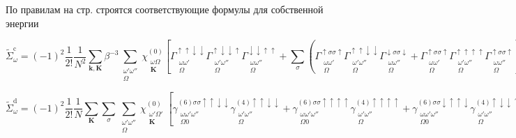 \documentclass[11pt,a4paper]{report}
\begin{document}
\vspace{1cm}

По правилам на стр.\pageref{rules} строятся соответствующие формулы для собственной энергии

\begin{equation}
 \tilde{\Sigma}^\text{c}_\omega = (-1)^2 \frac{1}{2!} \frac{1}{N^2} \sum_{\mathbf{k,K}} \beta^{-3}  \sum_{\substack{\omega'\omega''\\\Omega}} \chi_{\substack{\omega\Omega\\\mathbf{K}}}^{(0)}
 \left[
 \Gamma^{\uparrow\uparrow\downarrow\downarrow}_{\substack{\omega\omega'\\\Omega}}  \Gamma^{\uparrow\downarrow\downarrow\uparrow}_{\substack{\omega'\omega''\\\Omega}}  \Gamma^{\downarrow\downarrow\uparrow\uparrow}_{\substack{\omega\omega''\\\Omega}}
 + \sum_{\sigma} \left(
 \Gamma^{\uparrow\sigma\sigma\uparrow}_{\substack{\omega\omega'\\\Omega}}  \Gamma^{\uparrow\uparrow\downarrow\downarrow}_{\substack{\omega'\omega''\\\Omega}}  \Gamma^{\downarrow\sigma\sigma\downarrow}_{\substack{\omega\omega''\\\Omega}}+
 \Gamma^{\uparrow\sigma\sigma\uparrow}_{\substack{\omega\omega'\\\Omega}}  \Gamma^{\uparrow\uparrow\uparrow\uparrow}_{\substack{\omega'\omega''\\\Omega}}  \Gamma^{\uparrow\sigma\sigma\uparrow}_{\substack{\omega\omega''\\\Omega}}
 \right)
 \right]_\mathbf{K}
 \chi_{\substack{\omega''\Omega\\\mathbf{K}}}^{(0)}  G_{\substack{\omega+\Omega\\\mathbf{k+K}}}
\end{equation}

\begin{equation}
 \tilde{\Sigma}^\text{d}_\omega = (-1)^2 \frac{1}{2!} \frac{1}{N} \sum_{\mathbf{K}} \sum_{\sigma}\sum_{\substack{\omega'\omega''\\\Omega}}
 \chi_{\substack{\omega'\Omega'\\\mathbf{K}}}^{(0)} \left[
  \gamma^{(6)\sigma\sigma\uparrow\uparrow\downarrow\downarrow}_{\substack{\omega\omega'\omega''\\\Omega 0}} \gamma^{(4)\uparrow\uparrow\downarrow\downarrow}_{\substack{\omega'\omega''\\\Omega}} +
  \gamma^{(6)\sigma\sigma\uparrow\uparrow\uparrow\uparrow}_{\substack{\omega\omega'\omega''\\\Omega 0}}\gamma^{(4)\uparrow\uparrow\uparrow\uparrow}_{\substack{\omega'\omega''\\\Omega}} +
  \gamma^{(6)\sigma\sigma\downarrow\uparrow\uparrow\downarrow}_{\substack{\omega\omega'\omega''\\\Omega 0}} \gamma^{(4)\uparrow\downarrow\downarrow\uparrow}_{\substack{\omega'\omega''\\\Omega}} 
  \right]_\mathbf{K}
  \chi_{\substack{\omega''\Omega\\\mathbf{K}}}^{(0)}
\end{equation}
\end{document}

